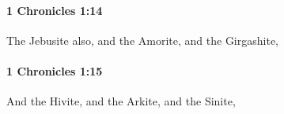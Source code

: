 		\paragraph{1 Chronicles 1:14} %
			\label{1CHRONICLES-1-14}

			The Jebusite also, and the Amorite, and the Girgashite,


		\paragraph{1 Chronicles 1:15} %
			\label{1CHRONICLES-1-15}

			And the Hivite, and the Arkite, and the Sinite,


